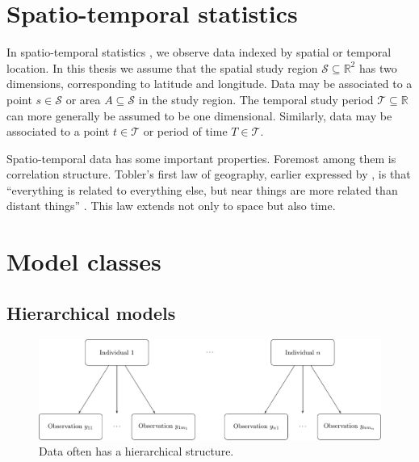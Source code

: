 \documentclass[a4paper, nobind]{templates/ociamthesis}
\begin{document}
\hypertarget{spatio-temporal-statistics}{%
\section{Spatio-temporal statistics}\label{spatio-temporal-statistics}}

In spatio-temporal statistics \autocite{cressie2015statistics}, we observe data indexed by spatial or temporal location.
In this thesis we assume that the spatial study region \(\mathcal{S} \subseteq \mathbb{R}^2\) has two dimensions, corresponding to latitude and longitude.
Data may be associated to a point \(s \in \mathcal{S}\) or area \(A \subseteq \mathcal{S}\) in the study region.
The temporal study period \(\mathcal{T} \subseteq \mathbb{R}\) can more generally be assumed to be one dimensional.
Similarly, data may be associated to a point \(t \in \mathcal{T}\) or period of time \(T \in \mathcal{T}\).

Spatio-temporal data has some important properties.
Foremost among them is correlation structure.
Tobler's first law of geography, earlier expressed by \textcite{fisher1936design}, is that ``everything is related to everything else, but near things are more related than distant things'' \autocite{tobler1970computer}.
This law extends not only to space but also time.

\hypertarget{hierarchical-lgm-elgm}{%
\section{Model classes}\label{hierarchical-lgm-elgm}}

\hypertarget{hierarchical}{%
\subsection{Hierarchical models}\label{hierarchical}}

\begin{figure}

{\centering \includegraphics[width=0.95\linewidth]{figures/bayesian/hierarchical-structure} 

}

\caption{Data often has a hierarchical structure.}\label{fig:hierarchical-structure}
\end{figure}
\end{document}
